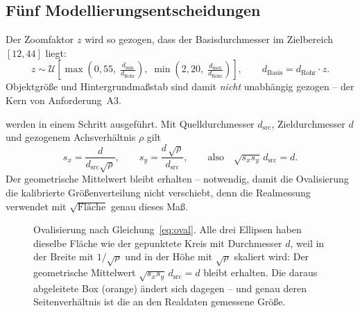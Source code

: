 \subsection{Fünf Modellierungsentscheidungen}

 Der Zoomfaktor $z$ wird so gezogen, dass der
Basisdurchmesser im Zielbereich $[12, 44]$\px{} liegt:
\begin{equation}
z \sim \mathcal{U}\!\left[\max\!\left(0{,}55,\;
\tfrac{d_{\min}}{d_{\text{Rohr}}}\right),\;
\min\!\left(2{,}20,\;\tfrac{d_{\max}}{d_{\text{Rohr}}}\right)\right],
\qquad d_{\text{Basis}} = d_{\text{Rohr}} \cdot z .
\label{eq:zoom}
\end{equation}
Objektgröße und Hintergrundmaßstab sind damit \emph{nicht} unabhängig gezogen --
der Kern von Anforderung~A3.

 werden in einem Schritt ausgeführt. Mit
Quelldurchmesser $d_{\text{src}}$, Zieldurchmesser $d$ und gezogenem
Achsverhältnis $\rho$ gilt
\begin{equation}
s_x = \frac{d}{d_{\text{src}}\sqrt{\rho}}, \qquad
s_y = \frac{d\,\sqrt{\rho}}{d_{\text{src}}},
\qquad\text{also}\quad \sqrt{s_x s_y}\, d_{\text{src}} = d .
\label{eq:oval}
\end{equation}
Der geometrische Mittelwert bleibt erhalten -- notwendig, damit die Ovalisierung
die kalibrierte Größenverteilung nicht verschiebt, denn die Realmessung verwendet
mit $\sqrt{\text{Fläche}}$ genau dieses Maß.

\begin{figure}[htbp]
\centering
{}
\caption[Ovalisierung]{Ovalisierung nach Gleichung~\eqref{eq:oval}. Alle drei
Ellipsen haben dieselbe Fläche wie der gepunktete Kreis mit Durchmesser $d$, weil
in der Breite mit $1/\sqrt{\rho}$ und in der Höhe mit $\sqrt{\rho}$
skaliert wird: Der geometrische Mittelwert $\sqrt{s_x s_y}\,d_{\text{src}} = d$
bleibt erhalten. Die daraus abgeleitete Box (orange) ändert sich dagegen -- und
genau deren Seitenverhältnis ist die an den Realdaten gemessene Größe.}
\label{abb:ovalisierung}
\end{figure}

